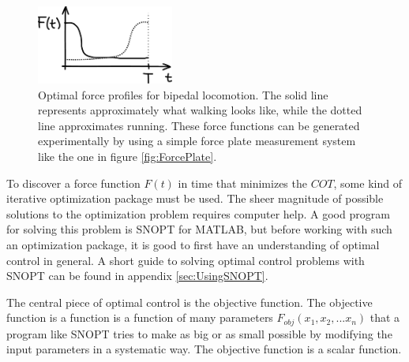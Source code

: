 \begin{figure}[h]		%
\begin{centering}
\includegraphics[width=0.4\textwidth]{Figures/ForceOptimization}\par
\end{centering}
\caption[Plot: Optimal Force Profiles for Bipedal Locomotion]{Optimal force profiles for bipedal locomotion. The solid line represents approximately what walking looks like, while the dotted line approximates running. These force functions can be generated experimentally by using a simple force plate measurement system like the one in figure \ref{fig:ForcePlate}. }
\label{fig:ForceOptimization}
\end{figure}
%

To discover a force function $F(t)$ in time that minimizes the $COT$, some kind of iterative optimization package must be used. The sheer magnitude of possible solutions to the optimization problem requires computer help. A good program for solving this problem is SNOPT  for MATLAB, but before working with such an optimization package, it is good to first have an understanding of optimal control in general. A short guide to solving optimal control problems with SNOPT can be found in appendix \ref{sec:UsingSNOPT}.

The central piece of optimal control is the objective function. The objective function is a function is a function of many parameters $F_{obj}(x_{1}, x_{2}, ... x_{n})$ that a program like SNOPT tries to make as big or as small possible by modifying the input parameters in a systematic way. The objective function is a scalar function.


